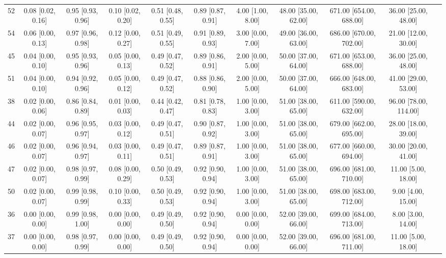 \documentclass[8pt]{article}
\begin{document}
\begin{center}
\begin{footnotesize}
\begin{longtable}{|ccccccccccc|}
 52 &  0.08 [0.02, 0.16] &  0.95 [0.93, 0.96] &  0.10 [0.02, 0.20] &  0.51 [0.48, 0.55] &  0.89 [0.87, 0.91] &     4.00 [1.00, 8.00] &  48.00 [35.00, 62.00] &  671.00 [654.00, 688.00] &     36.00 [25.00, 48.00] \\
 54 &  0.06 [0.00, 0.13] &  0.97 [0.96, 0.98] &  0.12 [0.00, 0.27] &  0.51 [0.49, 0.55] &  0.91 [0.89, 0.93] &     3.00 [0.00, 7.00] &  49.00 [36.00, 63.00] &  686.00 [670.00, 702.00] &     21.00 [12.00, 30.00] \\
 45 &  0.04 [0.00, 0.10] &  0.95 [0.93, 0.96] &  0.05 [0.00, 0.13] &  0.49 [0.47, 0.52] &  0.89 [0.86, 0.91] &     2.00 [0.00, 5.00] &  50.00 [37.00, 64.00] &  671.00 [653.00, 688.00] &     36.00 [25.00, 48.00] \\
 51 &  0.04 [0.00, 0.10] &  0.94 [0.92, 0.96] &  0.05 [0.00, 0.12] &  0.49 [0.47, 0.52] &  0.88 [0.86, 0.90] &     2.00 [0.00, 5.00] &  50.00 [37.00, 64.00] &  666.00 [648.00, 683.00] &     41.00 [29.00, 53.00] \\
 38 &  0.02 [0.00, 0.06] &  0.86 [0.84, 0.89] &  0.01 [0.00, 0.03] &  0.44 [0.42, 0.47] &  0.81 [0.78, 0.83] &     1.00 [0.00, 3.00] &  51.00 [38.00, 65.00] &  611.00 [590.00, 632.00] &    96.00 [78.00, 114.00] \\
 44 &  0.02 [0.00, 0.07] &  0.96 [0.95, 0.97] &  0.03 [0.00, 0.12] &  0.49 [0.47, 0.51] &  0.90 [0.87, 0.92] &     1.00 [0.00, 3.00] &  51.00 [38.00, 65.00] &  679.00 [662.00, 695.00] &     28.00 [18.00, 39.00] \\
 46 &  0.02 [0.00, 0.07] &  0.96 [0.94, 0.97] &  0.03 [0.00, 0.11] &  0.49 [0.47, 0.51] &  0.89 [0.87, 0.91] &     1.00 [0.00, 3.00] &  51.00 [38.00, 65.00] &  677.00 [660.00, 694.00] &     30.00 [20.00, 41.00] \\
 47 &  0.02 [0.00, 0.07] &  0.98 [0.97, 0.99] &  0.08 [0.00, 0.29] &  0.50 [0.49, 0.53] &  0.92 [0.90, 0.94] &     1.00 [0.00, 3.00] &  51.00 [38.00, 65.00] &  696.00 [681.00, 710.00] &      11.00 [5.00, 18.00] \\
 50 &  0.02 [0.00, 0.07] &  0.99 [0.98, 0.99] &  0.10 [0.00, 0.33] &  0.50 [0.49, 0.53] &  0.92 [0.90, 0.94] &     1.00 [0.00, 3.00] &  51.00 [38.00, 65.00] &  698.00 [683.00, 712.00] &       9.00 [4.00, 15.00] \\
 36 &  0.00 [0.00, 0.00] &  0.99 [0.98, 1.00] &  0.00 [0.00, 0.00] &  0.49 [0.49, 0.50] &  0.92 [0.90, 0.94] &     0.00 [0.00, 0.00] &  52.00 [39.00, 66.00] &  699.00 [684.00, 713.00] &       8.00 [3.00, 14.00] \\
 37 &  0.00 [0.00, 0.00] &  0.98 [0.97, 0.99] &  0.00 [0.00, 0.00] &  0.49 [0.49, 0.50] &  0.92 [0.90, 0.94] &     0.00 [0.00, 0.00] &  52.00 [39.00, 66.00] &  696.00 [681.00, 711.00] &      11.00 [5.00, 18.00] \\

\end{longtable}
\end{footnotesize}
\end{center}
\end{document}
